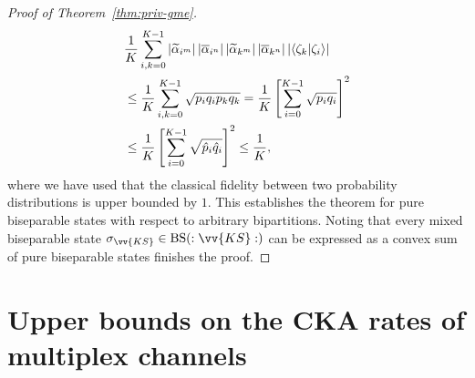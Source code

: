 \documentclass[aps,pra,twocolumn,superscriptaddress,longbibliography]{revtex4-1}
\def\BS{\operatorname{BS}}
\begin{document}
\begin{appendix}
\begin{proof}[Proof of Theorem~\ref{thm:priv-gme}]
\begin{align}
&\frac{1}{K}\sum_{i,k=0}^{K-1}\left|\widetilde{\alpha}_{i^m}\right|\left|\overline{\alpha}_{i^n}\right|\left|\widetilde{\alpha}_{k^m}\right|\left|\overline{\alpha}_{k^n}\right|\left|\bra{\zeta_k}\ket{\zeta_i}\right|\\
&\leq\frac{1}{K}\sum_{i,k=0}^{K-1}\sqrt{p_iq_ip_kq_k} =\frac{1}{K}\left[\sum_{i=0}^{K-1}\sqrt{p_iq_i}\right]^2\\
&\leq\frac{1}{K}\left[\sum_{i=0}^{K-1}\sqrt{\hat{p}_i\hat{q}_i}\right]^2\leq\frac{1}{K},
\end{align}
where we have used that the classical fidelity between two probability distributions is upper bounded by $1$. This establishes the theorem for pure biseparable states with respect to arbitrary bipartitions. Noting that every mixed biseparable state $\sigma_{\vv{KS}}\in\BS(:\vv{KS}:)$ can be expressed as a convex sum of pure biseparable states finishes the proof.
\end{proof}




\section{Upper bounds on the CKA rates of multiplex channels}

\end{appendix}
\end{document}
